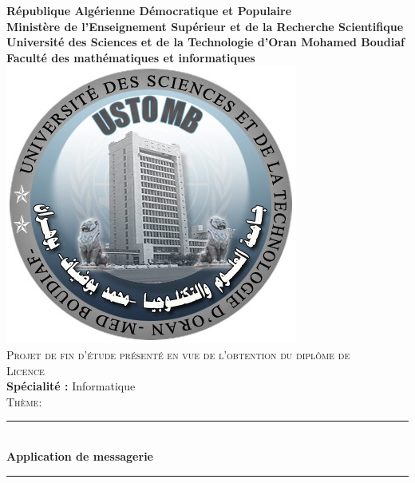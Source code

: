 \documentclass[12pt, openany]{report}
\newcommand{\HRule}{\rule{\linewidth}{0.5mm}}
\begin{document}
\begin{titlepage}
  \begin{sffamily}
  \begin{center}


    \textbf{\large République Algérienne Démocratique et Populaire}\\[0.2cm]
    \textbf{\large Ministère de l’Enseignement Supérieur et de la Recherche Scientifique}\\[0.2cm]
    \textbf{\large Université des Sciences et de la Technologie d’Oran Mohamed Boudiaf}\\[0.2cm]
    \textbf{\large Faculté des mathématiques et informatiques}\\[1.0cm]

  \includegraphics[scale=0.7]{Ustomb.JPG}
    \\[2cm]

	\textsc{\Large Projet de fin d'étude présenté en vue de l'obtention du diplôme de}\\[0.1cm]
	\textsc{\Large Licence}\\[0.5cm]
    \textbf{Spécialité : }Informatique\\[0.2cm]
    \textsc{\Large Thème:}\\[0.2cm]
    \HRule \\[0.4cm]
    { \huge \bfseries Application de messagerie \\[0.4cm] }

    \HRule \\[2cm]
    


\end{center}
\end{sffamily}
\end{titlepage}
\end{document}
